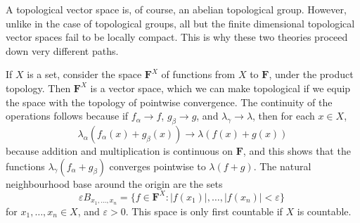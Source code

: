 \begin{remark}
    A topological vector space is, of course, an abelian topological group. However, unlike in the case of topological groups, all but the finite dimensional topological vector spaces fail to be locally compact. This is why these two theories proceed down very different paths.
\end{remark}

%
%

\begin{example}
    If $X$ is a set, consider the space $\mathbf{F}^X$ of functions from $X$ to $\mathbf{F}$, under the product topology. Then $\mathbf{F}^X$ is a vector space, which we can make topological if we equip the space with the topology of pointwise convergence. The continuity of the operations follows because if $f_\alpha \to f$, $g_\beta \to g$, and $\lambda_\gamma \to \lambda$, then for each $x \in X$,
    \[ \lambda_\alpha (f_\alpha(x) + g_\beta(x)) \to \lambda( f(x) + g(x)) \]
    because addition and multiplication is continuous on $\mathbf{F}$, and this shows that the functions $\lambda_\gamma (f_\alpha + g_\beta)$ converges pointwise to $\lambda(f + g)$. The natural neighbourhood base around the origin are the sets
    \[ \varepsilon B_{x_1, \dots, x_n} = \{ f \in \mathbf{F}^X : |f(x_1)|, \dots, |f(x_n)| < \varepsilon \}\ \]
    for $x_1, \dots, x_n \in X$, and $\varepsilon > 0$. This space is only first countable if $X$ is countable.
\end{example}

